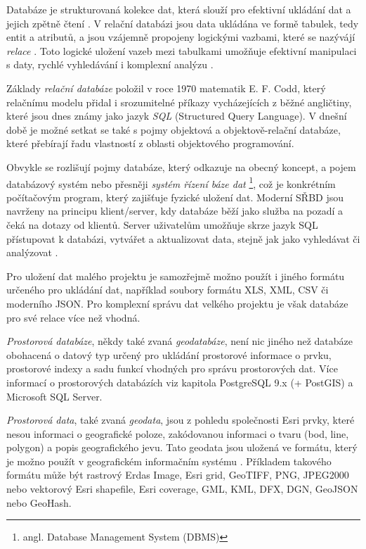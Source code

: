 Databáze je strukturovaná kolekce dat, která slouží pro efektivní ukládání dat a jejich zpětně čtení \citep{Oppel2009}. V relační databázi jsou data ukládána ve formě tabulek, tedy entit a atributů, a jsou vzájemně propojeny logickými vazbami, které se nazývájí {\it relace} \citep{Connolly2005}. Toto logické uložení vazeb mezi tabulkami umožňuje efektivní manipulaci s daty, rychlé vyhledávání i komplexní analýzu \citep{Momjian2001}. 

Základy {\it relační databáze} položil v roce 1970 matematik E. F. Codd, který relačnímu modelu přidal i srozumitelné příkazy vycházejících z běžné angličtiny, které jsou dnes známy jako jazyk {\it SQL} (Structured Query Language)\citep{Zak2001}. V dnešní době je možné setkat se také s pojmy objektová a objektově-relační databáze, které přebírají řadu vlastností z oblasti objektového programování.

Obvykle se rozlišují pojmy databáze, který odkazuje na obecný koncept, a pojem databázový systém nebo přesněji {\it systém řízení báze dat} \footnote{angl. Database Management System (DBMS)}, což je konkrétním počítačovým program, který zajišťuje fyzické uložení dat. Moderní SŘBD jsou navrženy na principu klient/server, kdy databáze běží jako služba na pozadí a čeká na dotazy od klientů. Server uživatelům umožňuje skrze jazyk SQL přístupovat k databázi, vytvářet a aktualizovat data, stejně jak jako vyhledávat či analýzovat \citep{Connolly2005}.

Pro uložení dat malého projektu je samozřejmě možno použít i jiného formátu určeného pro ukládání dat, například soubory formátu XLS, XML, CSV či moderního JSON. Pro komplexní správu dat velkého projektu je však databáze pro své relace více než vhodná. 

{\it Prostorová databáze}, někdy také zvaná {\it geodatabáze}, není nic jiného než databáze obohacená o datový typ určený pro ukládání prostorové informace o prvku, prostorové indexy a sadu funkcí vhodných pro správu prostorových dat. Více informací o prostorových databázích viz kapitola  PostgreSQL 9.x (+ PostGIS) a  Microsoft SQL Server. 

{\it Prostorová data}, také zvaná {\it geodata}, jsou z pohledu společnosti Esri prvky, které nesou informaci o geografické poloze, zakódovanou informaci o tvaru (bod, line, polygon) a popis geografického jevu. Tato geodata jsou uložená ve formátu, který je možno použít v geografickém informačním systému \citep{Esri2006}. Příkladem takového formátu může být rastrový Erdas Image, Esri grid, GeoTIFF, PNG,  JPEG2000 nebo vektorový Esri shapefile, Esri coverage, GML, KML, DFX, DGN, GeoJSON nebo GeoHash. 

